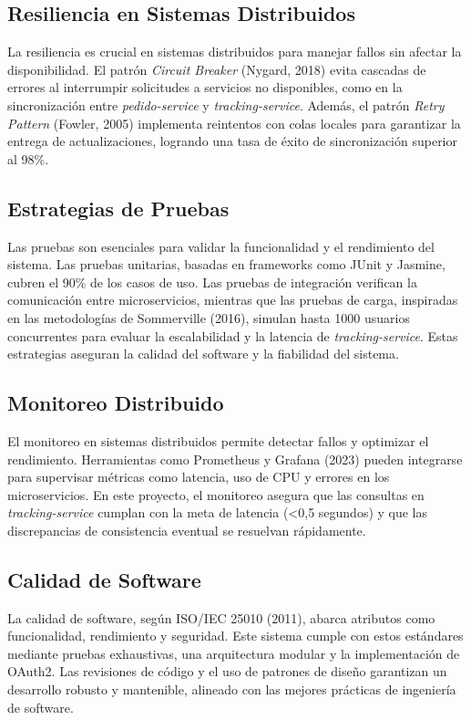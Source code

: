\documentclass[a4paper,12pt]{article}
\begin{document}
\subsection{Resiliencia en Sistemas Distribuidos}
La resiliencia es crucial en sistemas distribuidos para manejar fallos sin afectar la disponibilidad. El patrón \textit{Circuit Breaker} (Nygard, 2018) evita cascadas de errores al interrumpir solicitudes a servicios no disponibles, como en la sincronización entre \textit{pedido-service} y \textit{tracking-service}. Además, el patrón \textit{Retry Pattern} (Fowler, 2005) implementa reintentos con colas locales para garantizar la entrega de actualizaciones, logrando una tasa de éxito de sincronización superior al 98\%.

\subsection{Estrategias de Pruebas}
Las pruebas son esenciales para validar la funcionalidad y el rendimiento del sistema. Las pruebas unitarias, basadas en frameworks como JUnit y Jasmine, cubren el 90\% de los casos de uso. Las pruebas de integración verifican la comunicación entre microservicios, mientras que las pruebas de carga, inspiradas en las metodologías de Sommerville (2016), simulan hasta 1000 usuarios concurrentes para evaluar la escalabilidad y la latencia de \textit{tracking-service}. Estas estrategias aseguran la calidad del software y la fiabilidad del sistema.

\subsection{Monitoreo Distribuido}
El monitoreo en sistemas distribuidos permite detectar fallos y optimizar el rendimiento. Herramientas como Prometheus y Grafana (2023) pueden integrarse para supervisar métricas como latencia, uso de CPU y errores en los microservicios. En este proyecto, el monitoreo asegura que las consultas en \textit{tracking-service} cumplan con la meta de latencia (<0,5 segundos) y que las discrepancias de consistencia eventual se resuelvan rápidamente.

\subsection{Calidad de Software}
La calidad de software, según ISO/IEC 25010 (2011), abarca atributos como funcionalidad, rendimiento y seguridad. Este sistema cumple con estos estándares mediante pruebas exhaustivas, una arquitectura modular y la implementación de OAuth2. Las revisiones de código y el uso de patrones de diseño garantizan un desarrollo robusto y mantenible, alineado con las mejores prácticas de ingeniería de software.
\end{document}
